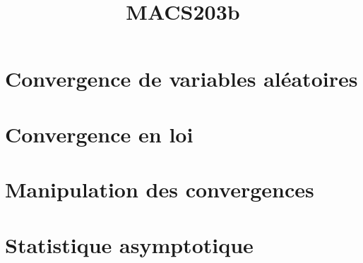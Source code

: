 \documentclass[a4paper,9pt]{article}
\title{\vspace{-1.2cm} \textbf{MACS203b}}
\begin{document}
\maketitle

\vspace{-1.5cm}


\section{Convergence de variables aléatoires}
	

\section{Convergence en loi}
	

\section{Manipulation des convergences}
	

\section{Statistique asymptotique}
	
\end{document}
